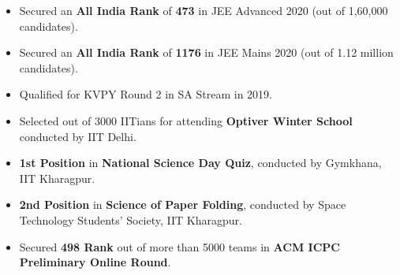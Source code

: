 \documentclass[10pt]{article}
\begin{document}
\vspace{-2.2ex}
{\color{headliner} \spacedhrule{0.15ex}{1.0ex}}
\begin{itemize}[leftmargin=*]
    \item Secured an \textbf{All India Rank} of \textbf{473} in JEE Advanced 2020 (out of 1,60,000 candidates). \\[-2em]
    
    \item Secured an \textbf{All India Rank} of \textbf{1176} in JEE Mains 2020 (out of 1.12 million candidates). \\[-2em]
    
    \item Qualified for KVPY Round 2 in SA Stream in 2019. \\[-2em]

    \item Selected out of 3000 IITians for attending \textbf{Optiver Winter School} conducted by IIT Delhi. \\[-2em]
    
    \item \textbf{1st Position} in \textbf{National Science Day Quiz}, conducted by Gymkhana, IIT Kharagpur. \\[-2em]
    
    \item \textbf{2nd Position} in \textbf{Science of Paper Folding}, conducted by Space Technology Students' Society,  IIT Kharagpur. \\[-2em]
    
    \item Secured \textbf{498 Rank} out of more than 5000 teams in \textbf{ACM ICPC Preliminary Online Round}. \\[-1.8em]
\end{itemize}

\vspace{-1ex}
{\color{headliner} \spacedhrule{0.15ex}{1.0ex}}
\begin{indentsection}
\end{indentsection}
\end{document}
